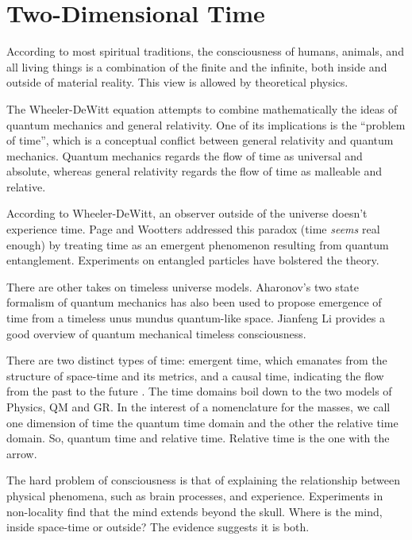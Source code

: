 \section{\label{sec:level1}Two-Dimensional Time}

According to most spiritual traditions, the consciousness of humans, animals,
and all living things is a combination of the finite and the infinite,
both inside and outside of material reality.
This view is allowed by theoretical physics.

The Wheeler-DeWitt equation \cite{DeWitt} attempts to combine mathematically
the ideas of quantum mechanics and general relativity.
One of its implications is the ``problem of time'',
which is a conceptual conflict between general relativity and quantum mechanics.
Quantum mechanics regards the flow of time as universal and absolute, whereas
general relativity regards the flow of time as malleable and relative.

According to Wheeler-DeWitt, an observer outside of the universe
doesn't experience time. Page and Wootters \cite{Page} addressed this paradox
(time \textit{seems} real enough) by treating time as an emergent phenomenon
resulting from quantum entanglement.
Experiments \cite{Moreva} on entangled particles have bolstered the theory.

There are other takes on timeless universe models. 
Aharonov's two state formalism of quantum mechanics has also been used
\cite{Lobo} to propose emergence of time from a timeless unus mundus
quantum-like space.
Jianfeng Li provides a good overview \cite{Jianfeng} of quantum mechanical
timeless consciousness.

There are two distinct types of time: emergent time, which emanates from the
structure of space-time and its metrics, and a causal time, indicating the flow
from the past to the future \cite{Brunet}. The time domains boil down to the
two models of Physics, QM and GR. 
In the interest of a nomenclature for the masses, we call one dimension of time
the quantum time domain and the other the relative time domain. 
So, quantum time and relative time. Relative time is the one with the arrow.

The hard problem of consciousness \cite{Chalmers} is that of explaining the
relationship between physical phenomena, such as brain processes,
and experience.
Experiments in non-locality \cite{Achterberg} find that the mind extends beyond
the skull. Where is the mind, inside space-time or outside?
The evidence suggests it is both.


